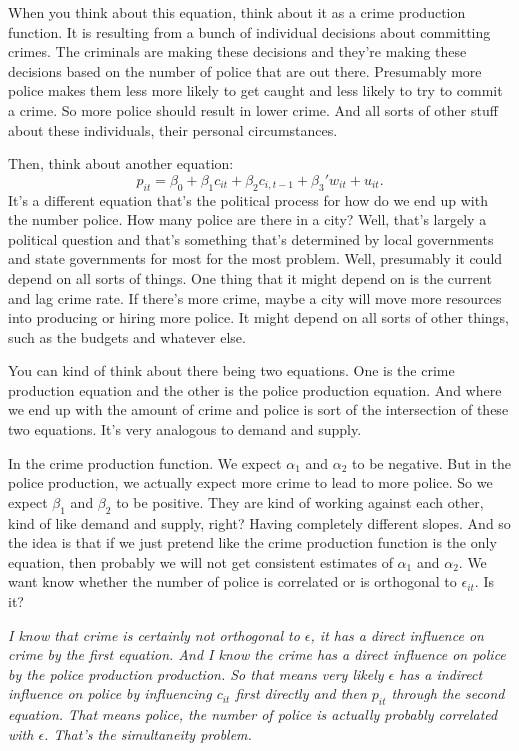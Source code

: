 \documentclass[11pt,a4paper]{amsart}
\theoremstyle{plain}
\theoremstyle{definition}
\begin{document}
 		 When you think about this equation, think about it as a crime production function. It is resulting from a bunch of individual decisions about committing crimes. The criminals are making these decisions and they're making these decisions based on the number of police that are out there. Presumably more police makes them less more likely to get caught and less likely to try to commit a crime. So more police should result in lower crime. And all sorts of other stuff about these individuals, their personal circumstances.\par 
 		 Then, think about another equation:
 		 \[	 p_{it} = \beta_{0} + \beta_{1}c_{it} + \beta_{2}c_{i,t-1} + \beta_{3}' w_{it} + u_{it}.	\]
 		 It's a different equation that's the political process for how do we end up with the number police. How many police are there in a city? Well, that's largely a political question and that's something that's determined by local governments and state governments for most for the most problem. Well, presumably it could depend on all sorts of things. One thing that it might depend on is the current and lag crime rate. If there's more crime, maybe a city will move more resources into producing or hiring more police. It might depend on all sorts of other things, such as the budgets and whatever else.\par 
 		 You can kind of think about there being two equations. One is the crime production equation and the other is the police production equation. And where we end up with the amount of crime and police is sort of the intersection of these two equations. It's very analogous to demand and supply.\par 
 		 In the crime production function. We expect $\alpha_{1}$ and $\alpha_{2}$ to be negative. But in the police production, we actually expect more crime to lead to more police. So we expect $\beta_{1}$ and $\beta_{2}$ to be positive. They are kind of working against each other, kind of like demand and supply, right? Having completely different slopes. And so the idea is that if we just pretend like the crime production function is the only equation, then probably we will not get consistent estimates of $\alpha_{1}$ and $\alpha_{2}$. We want know whether the number of police is correlated or is orthogonal to $\epsilon_{it}$.  Is it?\par 
 		 \emph{I know that crime is certainly not orthogonal to $\epsilon$, it has a direct influence on crime by the first equation. And I know the crime has a direct influence on police by the police production production. So that means very likely $\epsilon$ has a indirect influence on police by influencing $c_{it}$ first directly and then $p_{it}$ through the second equation. That means police, the number of police is actually probably correlated with $\epsilon$. That's the simultaneity problem.} \par 
\end{document}

